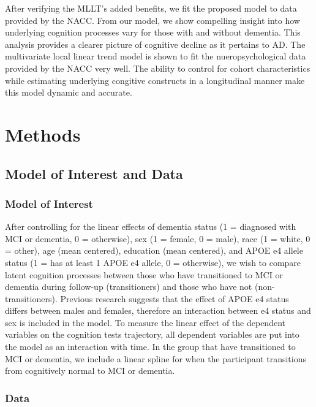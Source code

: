 \documentclass[
]{article}
\begin{document}
After verifying the MLLT's added benefits, we fit the proposed model to data provided by the NACC. From our model, we show compelling insight into how underlying cognition processes vary for those with and without dementia. This analysis provides a clearer picture of cognitive decline as it pertains to AD. The multivariate local linear trend model is shown to fit the nueropsychological data provided by the NACC very well. The ability to control for cohort characteristics while estimating underlying congitive constructs in a longitudinal manner make this model dynamic and accurate.

\hypertarget{methods}{%
\section{Methods}\label{methods}}

\hypertarget{model-of-interest-and-data}{%
\subsection{Model of Interest and Data}\label{model-of-interest-and-data}}

\hypertarget{MOI}{%
\subsubsection{Model of Interest}\label{MOI}}

After controlling for the linear effects of dementia status (1 = diagnosed with MCI or dementia, 0 = otherwise), sex (1 = female, 0 = male), race (1 = white, 0 = other), age (mean centered), education (mean centered), and APOE e4 allele status (1 = has at least 1 APOE e4 allele, 0 = otherwise), we wish to compare latent cognition processes between those who have transitioned to MCI or dementia during follow-up (transitioners) and those who have not (non-transitioners). Previous research suggests that the effect of APOE e4 status differs between males and females, therefore an interaction between e4 status and sex is included in the model. To measure the linear effect of the dependent variables on the cognition tests trajectory, all dependent variables are put into the model as an interaction with time. In the group that have transitioned to MCI or dementia, we include a linear spline for when the participant transitions from cognitively normal to MCI or dementia.

\hypertarget{DAT}{%
\subsubsection{Data}\label{DAT}}
\end{document}
